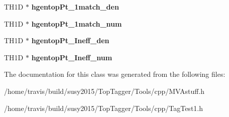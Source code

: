 \begin{DoxyCompactItemize}
\item 
\hypertarget{classBaseHistgram_a0fa09e911c2ded5f99d00232b464adc6}{T\-H1\-D $\ast$ {\bfseries hgentop\-Pt\-\_\-1match\-\_\-den}}\label{classBaseHistgram_a0fa09e911c2ded5f99d00232b464adc6}

\item 
\hypertarget{classBaseHistgram_addf80c34f00fc139ea2013cddce6016a}{T\-H1\-D $\ast$ {\bfseries hgentop\-Pt\-\_\-1match\-\_\-num}}\label{classBaseHistgram_addf80c34f00fc139ea2013cddce6016a}

\item 
\hypertarget{classBaseHistgram_ad3eccd4faefc9b910746e955b17c9a09}{T\-H1\-D $\ast$ {\bfseries hgentop\-Pt\-\_\-\-Ineff\-\_\-den}}\label{classBaseHistgram_ad3eccd4faefc9b910746e955b17c9a09}

\item 
\hypertarget{classBaseHistgram_a2d76b2910efcb17602abaef6bf73e694}{T\-H1\-D $\ast$ {\bfseries hgentop\-Pt\-\_\-\-Ineff\-\_\-num}}\label{classBaseHistgram_a2d76b2910efcb17602abaef6bf73e694}

\end{DoxyCompactItemize}


The documentation for this class was generated from the following files\-:\begin{DoxyCompactItemize}
\item 
/home/travis/build/susy2015/\-Top\-Tagger/\-Tools/cpp/M\-V\-Astuff.\-h\item 
/home/travis/build/susy2015/\-Top\-Tagger/\-Tools/cpp/Tag\-Test1.\-h\end{DoxyCompactItemize}
